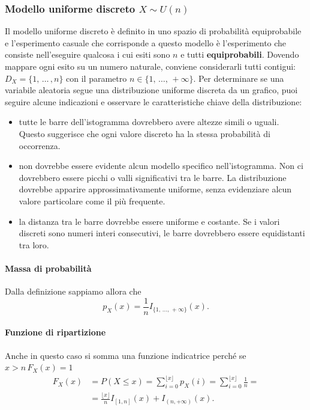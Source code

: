 \subsubsection{Modello uniforme discreto $X \sim U{(n)}$}
Il modello uniforme discreto è definito in uno spazio di probabilità equiprobabile e l'esperimento casuale che corrisponde a questo modello è l'esperimento che consiste nell'eseguire qualcosa i cui esiti sono $n$ e tutti \textbf{equiprobabili}. Dovendo mappare ogni esito su un numero naturale, conviene considerarli tutti contigui: $D_X = \{1, \, \dots \, , n\}$ con il parametro $n \in \{1, \, \dots, \, +\infty\}$.
\newline \newline
Per determinare se una variabile aleatoria segue una distribuzione uniforme discreta da un grafico, puoi seguire alcune indicazioni e osservare le caratteristiche chiave della distribuzione:
\begin{itemize}
    \item tutte le barre dell'istogramma dovrebbero avere altezze simili o uguali. Questo suggerisce che ogni valore discreto ha la stessa probabilità di occorrenza.
    \item non dovrebbe essere evidente alcun modello specifico nell'istogramma. Non ci dovrebbero essere picchi o valli significativi tra le barre. La distribuzione dovrebbe apparire approssimativamente uniforme, senza evidenziare alcun valore particolare come il più frequente.
    \item la distanza tra le barre dovrebbe essere uniforme e costante. Se i valori discreti sono numeri interi consecutivi, le barre dovrebbero essere equidistanti tra loro.
\end{itemize}

\paragraph{Massa di probabilità} Dalla definizione sappiamo allora che 
\[
\boxed{
p_X(x) = \frac{1}{n} I_{\{1, \, \dots, \, +\infty\}}(x)
}.
\]
\paragraph{Funzione di ripartizione} Anche in questo caso si somma una funzione indicatrice perché se $x > n \, F_X(x) = 1$ 
\begin{align*}
F_X(x) &= P(X \leq x)
= \sum_{i=0}^{\lfloor x \rfloor} p_X(i) = \sum_{i=0}^{\lfloor x \rfloor} \frac{1}{n} = \\ 
&= \frac{\lfloor x \rfloor}{n} I_{[1,n]}(x) + I_{(n, +\infty)}(x).
\end{align*}

